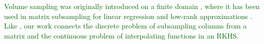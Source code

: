 \documentclass[twoside,11pt]{book}
\newcommand{\rev}[1]{\textcolor{darkgreen}{#1}}
\numberwithin{theorem}{chapter}
\numberwithin{definition}{chapter}
\numberwithin{proposition}{chapter}
\numberwithin{corollary}{chapter}
\numberwithin{example}{chapter}
\numberwithin{lemma}{chapter}
\begin{document}
\rev{
Volume sampling was originally introduced on a finite domain \citep{DRVW06}, where it has been used in matrix subsampling for linear regression and low-rank approximations \citep{DeWa17,BeBaCh18}. Like \citep{BeBaCh19}, our work connects the discrete problem of subsampling columns from a matrix and the continuous problem of interpolating functions in an RKHS.
}











\end{document}
